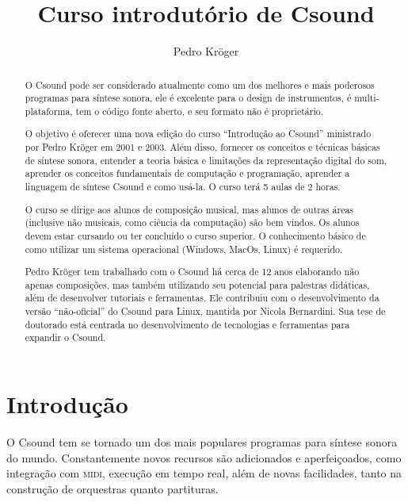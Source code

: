 \documentclass[12pt,brazil]{article}
\newcommand{\sigla}[1]{\textsc{#1}}
\begin{document}

\title{Curso introdutório de Csound}
\author{Pedro Kröger}
\maketitle

\begin{abstract}
O Csound pode ser considerado atualmente como um dos melhores e mais
poderosos programas para síntese sonora, ele é excelente para o design
de instrumentos, é multi-plataforma, tem o código fonte aberto, e seu
formato não é proprietário.

O objetivo é oferecer uma nova edição do curso ``Introdução ao
Csound'' ministrado por Pedro Kröger em 2001 e 2003. Além disso,
fornecer os conceitos e técnicas básicas de síntese sonora, entender a
teoria básica e limitações da representação digital do som, aprender
os conceitos fundamentais de computação e programação, aprender a
linguagem de síntese Csound e como usá-la. O curso terá 5 aulas de 2
horas.

O curso se dirige aos alunos de composição musical, mas alunos de
outras áreas (inclusive não musicais, como ciência da computação) são
bem vindos.  Os alunos devem estar cursando ou ter concluído o curso
superior.  O conhecimento básico de como utilizar um sistema
operacional (Windows, MacOs, Linux) é requerido.

Pedro Kröger tem trabalhado com o Csound há cerca de 12 anos
elaborando não apenas composições, mas também utilizando seu potencial
para palestras didáticas, além de desenvolver tutoriais e ferramentas.
Ele contribuiu com o desenvolvimento da versão ``não-oficial'' do
Csound para Linux, mantida por Nicola Bernardini. Sua tese de
doutorado está centrada no desenvolvimento de tecnologias e
ferramentas para expandir o Csound.
\end{abstract}

\thispagestyle{empty}

\section{Introdução}
O Csound tem se tornado um dos mais populares programas para síntese
sonora do mundo. Constantemente novos recursos são adicionados e
aperfeiçoados, como integração com \sigla{midi}, execução em tempo
real, além de novas facilidades, tanto na construção de orquestras
quanto partituras.
\end{document}
